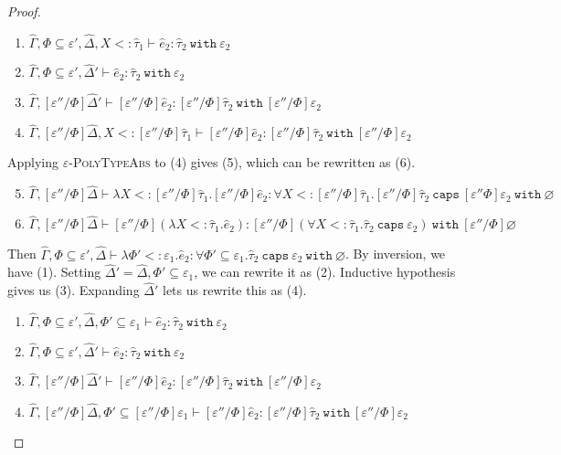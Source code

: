 \documentclass{llncs}
\newcommand{\keywadj}[1]{\mathtt{#1}}
\newcommand{\keyw}[1]{\keywadj{#1}~}
\newcommand{\kw}[1]{\keyw{ #1 }}
\begin{document}
\begin{proof}
\begin{enumerate}
	\item $\hat \Gamma, \Phi \subseteq \varepsilon', \hat \Delta, X <: \hat \tau_1 \vdash \hat e_2: \hat \tau_2~\kw{with} \varepsilon_2$
	\item $\hat \Gamma, \Phi \subseteq \varepsilon', \hat \Delta' \vdash \hat e_2: \hat \tau_2~\kw{with} \varepsilon_2$
	\item $\hat \Gamma, [\varepsilon''/\Phi]\hat \Delta' \vdash [\varepsilon''/\Phi]\hat e_2: [\varepsilon''/\Phi]\hat \tau_2~\kw{with} [\varepsilon''/\Phi]\varepsilon_2$
	\item $\hat \Gamma, [\varepsilon''/\Phi]\hat \Delta, X <: [\varepsilon''/\Phi]\hat \tau_1 \vdash [\varepsilon''/\Phi]\hat e_2: [\varepsilon''/\Phi]\hat \tau_2~\kw{with} [\varepsilon''/\Phi]\varepsilon_2$
\end{enumerate}

Applying \textsc{$\varepsilon$-PolyTypeAbs} to (4) gives (5), which can be rewritten as (6).

\begin{enumerate}
	\setcounter{enumi}{4}
	\item $\hat \Gamma, [\varepsilon''/\Phi]\hat \Delta \vdash \lambda X <: [\varepsilon''/\Phi]\hat \tau_1. [\varepsilon''/\Phi]\hat e_2: \forall X <: [\varepsilon''/\Phi]\hat \tau_1. [\varepsilon''/\Phi]\hat \tau_2~\kw{caps} [\varepsilon''\Phi]\varepsilon_2~\kw{with} \varnothing$
	\item $\hat \Gamma, [\varepsilon''/\Phi]\hat \Delta \vdash [\varepsilon''/\Phi](\lambda X <: \hat \tau_1. \hat e_2) : [\varepsilon''/\Phi](\forall X <: \hat \tau_1. \hat \tau_2~\kw{caps} \varepsilon_2)~\kw{with} [\varepsilon''/\Phi]\varnothing$
\end{enumerate}

 Then $\hat \Gamma, \Phi \subseteq \varepsilon', \hat \Delta \vdash \lambda \Phi' <: \varepsilon_1. \hat e_2: \forall \Phi' \subseteq \varepsilon_1. \hat \tau_2~\kw{caps} \varepsilon_2~\kw{with} \varnothing$. By inversion, we have (1). Setting $\hat \Delta' = \hat \Delta, \Phi' \subseteq \varepsilon_1$, we can rewrite it as (2). Inductive hypothesis gives us (3). Expanding $\hat \Delta'$ lets us rewrite this as (4).

\begin{enumerate}
	\item $\hat \Gamma, \Phi \subseteq \varepsilon', \hat \Delta, \Phi' \subseteq \varepsilon_1 \vdash \hat e_2: \hat \tau_2~\kw{with} \varepsilon_2$
	\item $\hat \Gamma, \Phi \subseteq \varepsilon', \hat \Delta' \vdash \hat e_2: \hat \tau_2~\kw{with} \varepsilon_2$
	\item $\hat \Gamma, [\varepsilon''/\Phi]\hat \Delta' \vdash [\varepsilon''/\Phi]\hat e_2: [\varepsilon''/\Phi]\hat \tau_2~\kw{with} [\varepsilon''/\Phi]\varepsilon_2$
	\item $\hat \Gamma, [\varepsilon''/\Phi]\hat \Delta, \Phi' \subseteq [\varepsilon''/\Phi]\varepsilon_1 \vdash [\varepsilon''/\Phi]\hat e_2: [\varepsilon''/\Phi]\hat \tau_2~\kw{with} [\varepsilon''/\Phi]\varepsilon_2$
\end{enumerate}


\end{proof}
\end{document}
